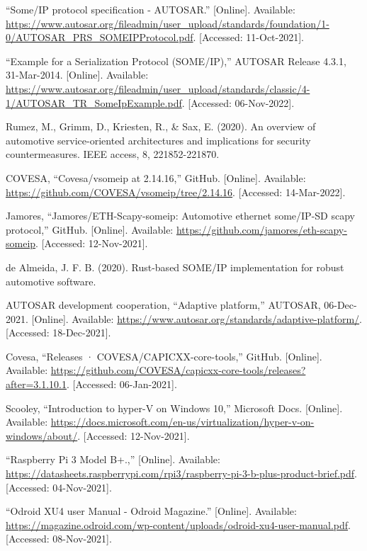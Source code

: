 \documentclass[a4paper, 12pt, oneside, BCOR1cm,toc=chapterentrywithdots]{scrbook}
\begin{document}
\begin{thebibliography}{00}
“Some/IP protocol specification - AUTOSAR.” [Online]. Available: \url{https://www.autosar.org/fileadmin/user\_upload/standards/foundation/1-0/AUTOSAR\_PRS\_SOMEIPProtocol.pdf}. [Accessed: 11-Oct-2021]. 

“Example for a Serialization Protocol (SOME/IP),” AUTOSAR Release 4.3.1, 31-Mar-2014. [Online]. Available: \url{https://www.autosar.org/fileadmin/user\_upload/standards/classic/4-1/AUTOSAR\_TR\_SomeIpExample.pdf}. [Accessed: 06-Nov-2022]. 

Rumez, M., Grimm, D., Kriesten, R., \& Sax, E. (2020). An overview of automotive service-oriented architectures and implications for security countermeasures. IEEE access, 8, 221852-221870.

COVESA, “Covesa/vsomeip at 2.14.16,” GitHub. [Online]. Available: \url{https://github.com/COVESA/vsomeip/tree/2.14.16}. [Accessed: 14-Mar-2022]. 

Jamores, “Jamores/ETH-Scapy-someip: Automotive ethernet some/IP-SD scapy protocol,” GitHub. [Online]. Available: \url{https://github.com/jamores/eth-scapy-someip}. [Accessed: 12-Nov-2021]. 

de Almeida, J. F. B. (2020). Rust-based SOME/IP implementation for robust automotive software.

AUTOSAR development cooperation, “Adaptive platform,” AUTOSAR, 06-Dec-2021. [Online]. Available: \url{https://www.autosar.org/standards/adaptive-platform/}. [Accessed: 18-Dec-2021]. 

Covesa, “Releases · COVESA/CAPICXX-core-tools,” GitHub. [Online]. Available: \url{https://github.com/COVESA/capicxx-core-tools/releases?after=3.1.10.1}. [Accessed: 06-Jan-2021]. 

Scooley, “Introduction to hyper-V on Windows 10,” Microsoft Docs. [Online]. Available: \url{https://docs.microsoft.com/en-us/virtualization/hyper-v-on-windows/about/}. [Accessed: 12-Nov-2021]. 

“Raspberry Pi 3 Model B+.,”  [Online]. Available: \url{https://datasheets.raspberrypi.com/rpi3/raspberry-pi-3-b-plus-product-brief.pdf}. [Accessed: 04-Nov-2021]. 

“Odroid XU4 user Manual - Odroid Magazine.” [Online]. Available: \url{https://magazine.odroid.com/wp-content/uploads/odroid-xu4-user-manual.pdf}. [Accessed: 08-Nov-2021]. 


\end{thebibliography}
\end{document}
